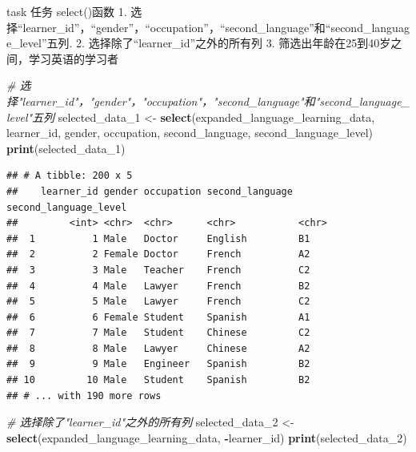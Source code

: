 \documentclass[]{book}
\newenvironment{Shaded}{\begin{snugshade}}{\end{snugshade}}
\newcommand{\CommentTok}[1]{\textcolor[rgb]{0.56,0.35,0.01}{\textit{#1}}}
\newcommand{\DecValTok}[1]{\textcolor[rgb]{0.00,0.00,0.81}{#1}}
\newcommand{\KeywordTok}[1]{\textcolor[rgb]{0.13,0.29,0.53}{\textbf{#1}}}
\newcommand{\NormalTok}[1]{#1}
\newcommand{\OperatorTok}[1]{\textcolor[rgb]{0.81,0.36,0.00}{\textbf{#1}}}
\newcommand{\StringTok}[1]{\textcolor[rgb]{0.31,0.60,0.02}{#1}}
\begin{document}
\begin{infobox}task
任务
select()函数
1. 选择``learner\_id''，``gender''，``occupation''，``second\_language''和``second\_language\_level''五列.
2. 选择除了``learner\_id''之外的所有列
3. 筛选出年龄在25到40岁之间，学习英语的学习者

\end{infobox}

\begin{Shaded}
\begin{Highlighting}[]
\CommentTok{# 选择"learner_id"，"gender"，"occupation"，"second_language"和"second_language_level"五列}
\NormalTok{selected_data_}\DecValTok{1}\NormalTok{ <-}\StringTok{ }\KeywordTok{select}\NormalTok{(expanded_language_learning_data, learner_id, gender, occupation, second_language, second_language_level)}
\KeywordTok{print}\NormalTok{(selected_data_}\DecValTok{1}\NormalTok{)}
\end{Highlighting}
\end{Shaded}

\begin{verbatim}
## # A tibble: 200 x 5
##    learner_id gender occupation second_language second_language_level
##         <int> <chr>  <chr>      <chr>           <chr>
##  1          1 Male   Doctor     English         B1
##  2          2 Female Doctor     French          A2
##  3          3 Male   Teacher    French          C2
##  4          4 Male   Lawyer     French          B2
##  5          5 Male   Lawyer     French          C2
##  6          6 Female Student    Spanish         A1
##  7          7 Male   Student    Chinese         C2
##  8          8 Male   Lawyer     Chinese         A2
##  9          9 Male   Engineer   Spanish         B2
## 10         10 Male   Student    Spanish         B2
## # ... with 190 more rows
\end{verbatim}

\begin{Shaded}
\begin{Highlighting}[]
\CommentTok{# 选择除了"learner_id"之外的所有列}
\NormalTok{selected_data_}\DecValTok{2}\NormalTok{ <-}\StringTok{ }\KeywordTok{select}\NormalTok{(expanded_language_learning_data, }\OperatorTok{-}\NormalTok{learner_id)}
\KeywordTok{print}\NormalTok{(selected_data_}\DecValTok{2}\NormalTok{)}
\end{Highlighting}
\end{Shaded}
\end{document}
